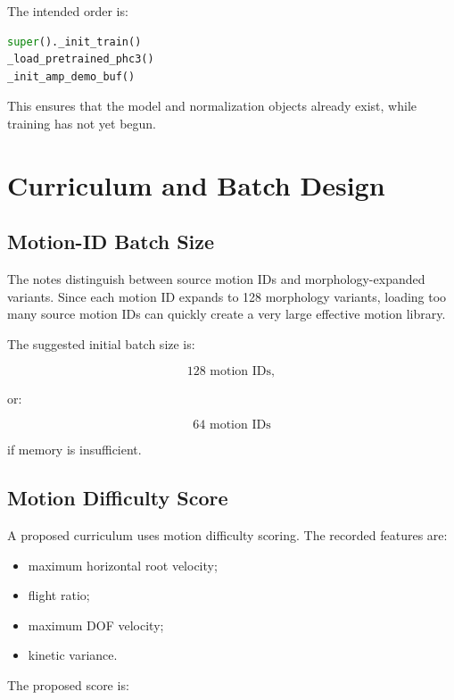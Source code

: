 \documentclass[11pt,a4paper]{article}
\begin{document}
The intended order is:

\begin{lstlisting}[language=Python]
super()._init_train()
_load_pretrained_phc3()
_init_amp_demo_buf()
\end{lstlisting}

This ensures that the model and normalization objects already exist, while training has not yet begun.

\section{Curriculum and Batch Design}

\subsection{Motion-ID Batch Size}

The notes distinguish between source motion IDs and morphology-expanded variants. Since each motion ID expands to 128 morphology variants, loading too many source motion IDs can quickly create a very large effective motion library.

The suggested initial batch size is:

\begin{equation}
    128 \text{ motion IDs},
\end{equation}

or:

\begin{equation}
    64 \text{ motion IDs}
\end{equation}

if memory is insufficient.

\subsection{Motion Difficulty Score}

A proposed curriculum uses motion difficulty scoring. The recorded features are:

\begin{itemize}[leftmargin=2em]
    \item maximum horizontal root velocity;
    \item flight ratio;
    \item maximum DOF velocity;
    \item kinetic variance.
\end{itemize}

The proposed score is:
\end{document}
